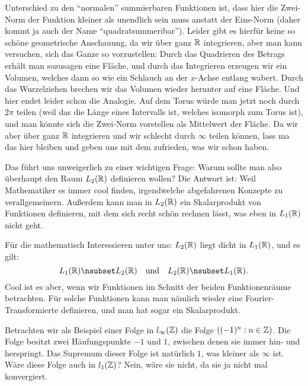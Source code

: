 \begin{remark}
Unterschied zu den \enquote{normalen} summierbaren Funktionen ist, dass hier die Zwei-Norm der
Funktion kleiner als unendlich sein muss anstatt der Eins-Norm (daher kommt ja auch der Name
\enquote{quadratsummeribar}). Leider gibt es hierfür keine so schöne geometrische Anschauung, da wir
über ganz $ \mathbb{R} $ integrieren, aber man kann versuchen, sich das Ganze so vorzustellen: Durch das
Quadrieren des Betrags erhält man sozusagen eine Fläche, und durch das Integrieren erzeugen wir
ein Volumen, welches dann so wie ein Schlauch an der $ x $-Achse entlang wabert. Durch das 
Wurzelziehen brechen wir das Volumen wieder herunter auf eine Fläche. Und hier endet leider schon
die Analogie. Auf dem Torus würde man jetzt noch durch $ 2\pi $ teilen (weil das die Länge eines
Intervalls ist, welches isomorph zum Torus ist), und man könnte sich die Zwei-Norm vorstellen als
Mittelwert der Fläche. Da wir aber über ganz $ \mathbb{R} $ integrieren und wir schlecht durch $ \infty $
teilen können, lass ma das hier bleiben und geben uns mit dem zufrieden, was wir schon haben. 

Das führt uns unweigerlich zu einer wichtigen Frage: Warum sollte man also überhaupt den Raum $ 
L_{2}(\mathbb{R}) $ definieren wollen? Die Antwort ist: Weil Mathematiker es immer cool finden, 
irgendwelche abgefahrenen Konzepte zu verallgemeinern. Außerdem kann man in $ L_{2}(\mathbb{R}) $ ein 
Skalarprodukt von Funktionen definieren, mit dem sich recht schön rechnen lässt, was eben in 
$ L_{1}(\mathbb{R}) $ nicht geht.

Für die mathematisch Interessieren unter uns: $ L_{2}(\mathbb{R}) $ liegt dicht in $ L_{1}(\mathbb{R}) $, und es
gilt:
\[
  L_{1}(\R) \nsubset L_{2}(\R) \quad \text{und} \quad L_{2}(\R) \nsubset L_{1}(\R).
\]
Cool ist es aber, wenn wir Funktionen im Schnitt der beiden Funktionenräume betrachten. Für solche
Funktionen kann man nämlich wieder eine Fourier-Transformierte definieren, und man hat sogar ein
Skalarprodukt.
\end{remark}

\begin{example}
Betrachten wir als Beispiel einer Folge in $ l_{\infty}(\mathbb{Z}) $ die Folge $ ((-1)^{n} : n \in \mathbb{Z}) $.
Die Folge besitzt zwei Häufungspunkte $ -1 $ und $ 1 $, zwischen denen sie immer hin- und 
herspringt. Das Supremum dieser Folge ist natürlich $ 1 $, was kleiner als $ \infty $ ist. Wäre 
diese Folge auch in $ l_{1}(\mathbb{Z}) $? Nein, wäre sie nicht, da sie ja nicht mal konvergiert.
\end{example}

